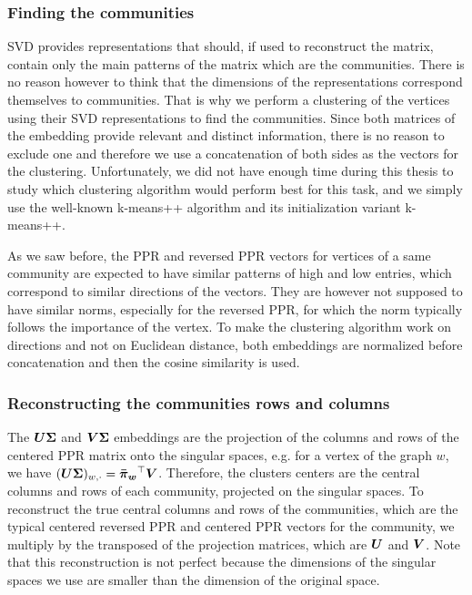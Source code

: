 \subsubsection{Finding the communities}
SVD provides representations that should, if used to reconstruct the matrix, contain only the main patterns of the matrix which are the communities. There is no reason however to think that the dimensions of the representations correspond themselves to communities. That is why we perform a clustering of the vertices using their SVD representations to find the communities. Since both matrices of the embedding provide relevant and distinct information, there is no reason to exclude one and therefore we use a concatenation of both sides as the vectors for the clustering. 
Unfortunately, we did not have enough time during this thesis to study which clustering algorithm would perform best for this task, and we simply use the well-known k-means++ algorithm and its initialization variant k-means++.

As we saw before, the PPR and reversed PPR vectors for vertices of a same community are expected to have similar patterns of high and low entries, which correspond to similar directions of the vectors. They are however not supposed to have similar norms, especially for the reversed PPR, for which the norm typically follows the importance of the vertex. To make the clustering algorithm work on directions and not on Euclidean distance, both embeddings are normalized before concatenation and then the cosine similarity is used.

\subsubsection{Reconstructing the communities rows and columns}
The $\boldsymbol{U}\boldsymbol{\Sigma}$ and $\boldsymbol{V}\boldsymbol{\Sigma}$ embeddings are the projection of the columns and rows of the centered PPR matrix onto the singular spaces, e.g. for a vertex of the graph $w$, we have $ (\boldsymbol{U}\boldsymbol{\Sigma})_{w, \cdot} = \boldsymbol{\Bar{\pi}_w}^\top\boldsymbol{V}$. Therefore, the clusters centers are the central columns and rows of each community, projected on the singular spaces. To reconstruct the true central columns and rows of the communities, which are the typical centered reversed PPR and centered PPR vectors for the community, we multiply by the transposed of the projection matrices, which are $\boldsymbol{U}$ and $\boldsymbol{V}$. Note that this reconstruction is not perfect because the dimensions of the singular spaces we use are smaller than the dimension of the original space.

